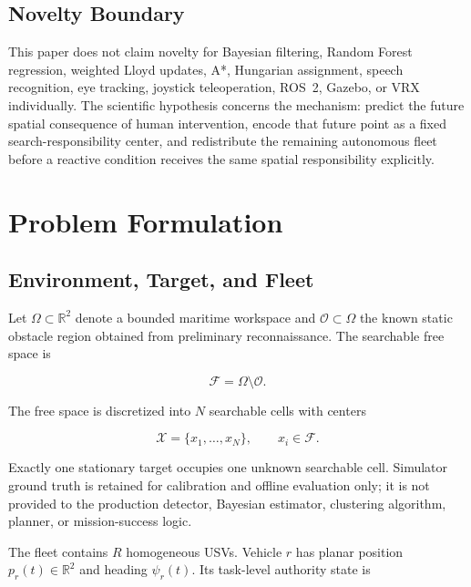 \documentclass[conference]{IEEEtran}
\begin{document}
\subsection{Novelty Boundary}

This paper does not claim novelty for Bayesian filtering, Random Forest
regression, weighted Lloyd updates, A*, Hungarian assignment, speech
recognition, eye tracking, joystick teleoperation, ROS~2, Gazebo, or VRX
individually. The scientific hypothesis concerns the mechanism: predict the
future spatial consequence of human intervention, encode that future point as
a fixed search-responsibility center, and redistribute the remaining
autonomous fleet before a reactive condition receives the same spatial
responsibility explicitly.

\section{Problem Formulation}

\subsection{Environment, Target, and Fleet}

Let $\Omega\subset\mathbb{R}^2$ denote a bounded maritime workspace and
$\mathcal{O}\subset\Omega$ the known static obstacle region obtained from
preliminary reconnaissance. The searchable free space is

\begin{equation}
\mathcal{F}=\Omega\setminus\mathcal{O}.
\label{eq:free_space}
\end{equation}

The free space is discretized into $N$ searchable cells with centers

\begin{equation}
\mathcal{X}=\{x_1,\ldots,x_N\},\qquad x_i\in\mathcal{F}.
\label{eq:cells}
\end{equation}

Exactly one stationary target occupies one unknown searchable cell. Simulator
ground truth is retained for calibration and offline evaluation only; it is not
provided to the production detector, Bayesian estimator, clustering algorithm,
planner, or mission-success logic.

The fleet contains $R$ homogeneous USVs. Vehicle $r$ has planar position
$p_r(t)\in\mathbb{R}^2$ and heading $\psi_r(t)$. Its task-level authority state
is
\end{document}
